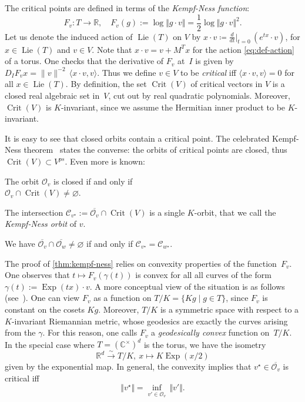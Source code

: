 \documentclass[a4paper,USenglish,cleveref,numberwithinsect]{lipics-v2021}
\DeclareMathOperator{\Exp}{Exp}
\DeclareMathOperator{\Lie}{Lie}
\DeclareMathOperator{\Crit}{Crit}
\newcommand{\CC}{\mathbb{C}}
\newcommand{\RR}{\mathbb{R}}
\newcommand{\OO}{\ensuremath{\mathcal{O}}}
\newcommand{\KK}{\ensuremath{\mathcal{C}}}
\numberwithin{equation}{section}
\begin{document}
The critical points are defined in terms of the \textit{Kempf-Ness function}:
\begin{equation}\label{eq:kn-function}
    F_v\colon T \rightarrow \RR, \quad F_v(g) := \log\Vert g \cdot v\Vert = \frac12 \log\Vert g \cdot v\Vert^2.
\end{equation}
Let us denote the induced action of $\Lie(T)$ on $V$
by  $x\cdot v \coloneqq \frac{d}{dt}\big |_{t=0} \, (e^{tx}\cdot v)$,
for $x\in\Lie(T)$ and $v\in V$.
Note that $x\cdot v = v + M^T x$
for the action \cref{eq:def-action} of a torus.
One checks that the derivative of $F_v$ at~$I$ is given by
$D_I F_v x = \|v\|^{-2}\, \langle x\cdot v, v\rangle$.
Thus we define $v\in V$ to be \textit{critical} iff
$\langle x\cdot v, v\rangle = 0$ for all $x\in\Lie(T)$.
By definition, the set $\Crit(V)$ of critical vectors in $V$ is a closed real algebraic set in~$V$,
cut out by real quadratic polynomials.
Moreover, $\Crit(V)$ is $K$-invariant,
since we assume the Hermitian inner product to be $K$-invariant.

It is easy to see that closed orbits contain a critical point.
The celebrated Kempf-Ness theorem~\cite{kempfness} states
the converse: the orbits of critical points are closed, thus
$\Crit(V)\subset V^{ps}$.
Even more is known:

\begin{theorem}\label{thm:kempf-ness}
\begin{alphaenumerate}
\item The orbit $\OO_v$ is closed if and only if \\$\OO_v\cap \Crit(V)\neq\varnothing$.
\item The intersection $\KK_{v^\star}:=\overline{\OO_v}\cap\Crit(V)$ is a single $K$-orbit,
 that we call the \textit{Kempf-Ness orbit} of $v$.
\item %
 We have $\overline{\OO_v}\cap\overline{\OO_w}\neq\varnothing$ if and only if $\KK_{v^\star}=\KK_{w^\star}$.
\end{alphaenumerate}
\end{theorem}

The proof of \cref{thm:kempf-ness} relies on convexity properties of the function~$F_v$.
One observes that $t\mapsto F_v(\gamma(t))$ is convex for all all curves of the form
$\gamma(t):= \Exp(tx) \cdot v$.
A more conceptual view of the situation is as follows (see~\cite{BFGOWW2}).
One can view $F_v$ as a function on $T/K =\{ Kg \mid g \in T \}$,
since $F_v$ is constant on the cosets $Kg$.
Moreover, $T/K$ is a symmetric space with respect to a $K$-invariant
Riemannian metric, whose geodesics are exactly the curves arising from the $\gamma$.
For this reason, one calls $F_v$ a \textit{geodesically convex} function on~$T/K$.
In the special case where $T=(\CC^\times)^d$ is the torus, we have the isometry
\begin{equation}\label{eq:exp-par}
 \RR^d \stackrel{\sim}{\longrightarrow} T/K, \ x\mapsto K \Exp(x/2)
\end{equation}
given by the exponential map.
In general, the convexity implies that $v^\star\in\overline{\OO_v}$ is critical iff
\[
\Vert v^\star\Vert = \inf_{v'\in\OO_v} \, \Vert v'\Vert.
\]
\end{document}

